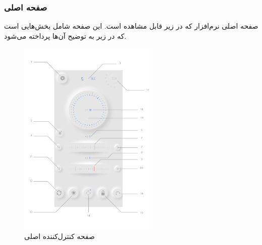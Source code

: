 \documentclass[a4paper,12pt]{report}
\begin{document}
	\subsubsection{
	صفحه اصلی
	}\label{subsec2:sec2:chap2}
	صفحه اصلی نرم‌افزار که در زیر قابل مشاهده است.
	این صفحه شامل بخش‌هایی است که در زیر به توضیح آن‌ها پرداخته می‌شود.
	\\


	\begin{figure}[!h]
		\centering

		\includegraphics[width=0.6\textwidth]{resources/control-panel-labeled.pdf}
		\caption{
			صفحه کنترل‌کننده اصلی
		}
		\label{fig1:subsec2:sec2:chap2}
	\end{figure}
\end{document}
